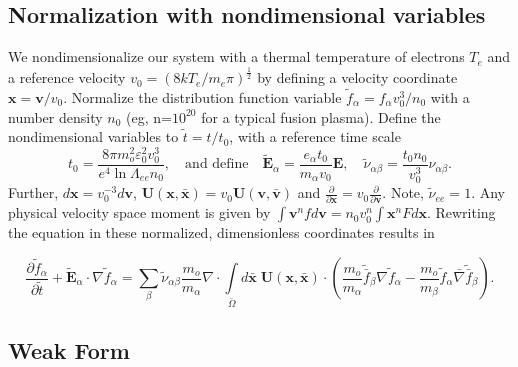 \documentclass[12pt]{siamart}
\begin{document}
\subsection{Normalization with nondimensional variables}

We nondimensionalize our system with a  thermal temperature of electrons $T_e$ and a reference velocity $v_0 = \left ( 8kT_e/m_e\pi \right)^{\frac{1}{2}} $ by defining a velocity coordinate ${\bm x = \bm v / v_0}$.
Normalize the distribution function variable  $\tilde f_{\alpha} = f_{\alpha}v_0^3/n_0$ with a number density $n_0$ (eg, n=$10^{20}$ for a typical fusion plasma).
Define the nondimensional variables to $\tilde t = t/t_0$,  with a reference time scale 
\begin{equation}
\label{eq:ndvars}
t_0 = \frac{8\pi m_o^2\varepsilon_0^2v_0^3}{e^4\ln\Lambda_{ee}n_0}, \quad \text{and define} \quad
\tilde {\bm E}_{\alpha} = \frac{ e_\alpha t_0}{m_{\alpha}v_0} {\bm E}, \quad
\tilde \nu_{\alpha\beta} = \frac{t_0n_0}{v_0^3} \nu_{\alpha\beta}.
\end{equation}
Further, $d\bm{{x}} = v_0^{-3} d\bm{{v}}$, $\mathbf{U}(\bm{x},\bm{\bar{x}}) = v_0\mathbf{U}(\bm{v},\bm{\bar{v}})$  and $\frac{\partial}{\partial \bm x} = v_0\frac{\partial}{\partial \bm v }$.
Note, $\tilde \nu_{ee}=1$.
Any physical velocity space moment is given by $\int \bm{v}^n fd\bm{v}=n_0v_0^{n}\int \bm{x}^nF d\bm{x}$. 
Rewriting the equation in these normalized, dimensionless coordinates results in

\begin{equation*}
\label{eq:landau2}
\frac{\partial \tilde f_{\alpha}}{\partial \tilde t}+ \tilde{\bm E}_{\alpha} \cdot \nabla \tilde f_{\alpha} = 
\sum_{\beta} \tilde \nu_{\alpha\beta}\frac{m_o}{m_{\alpha}}\nabla \cdot\int \limits_{\bar\Omega} d\bm{\bar{x}}\;\mathbf{U}(\bm{x},\bm{\bar{x}})\cdot\left(\frac{m_o}{m_{\alpha}} \tilde {\bar{f}}_{\beta} \nabla \tilde f_{\alpha} - \frac{m_o}{m_{\beta}} \tilde f_{\alpha} {\bar  \nabla} \tilde {\bar {f}}_{\beta}\right).
\end{equation*}

\subsection{Weak Form}
\end{document}
